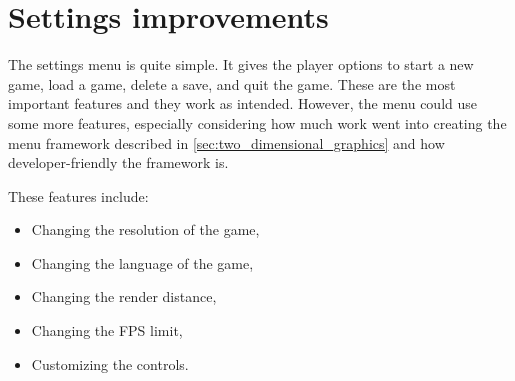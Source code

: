 \section{Settings improvements}
The settings menu is quite simple.
It gives the player options to start a new game, load a game, delete a save, and quit the game.
These are the most important features and they work as intended.
However, the menu could use some more features, especially considering how much work went into creating the menu framework described in \autoref{sec:two_dimensional_graphics} and how developer-friendly the framework is.

These features include:
\begin{itemize}
    \item Changing the resolution of the game,
    \item Changing the language of the game,
    \item Changing the render distance,
    \item Changing the FPS limit,
    \item Customizing the controls.
\end{itemize}